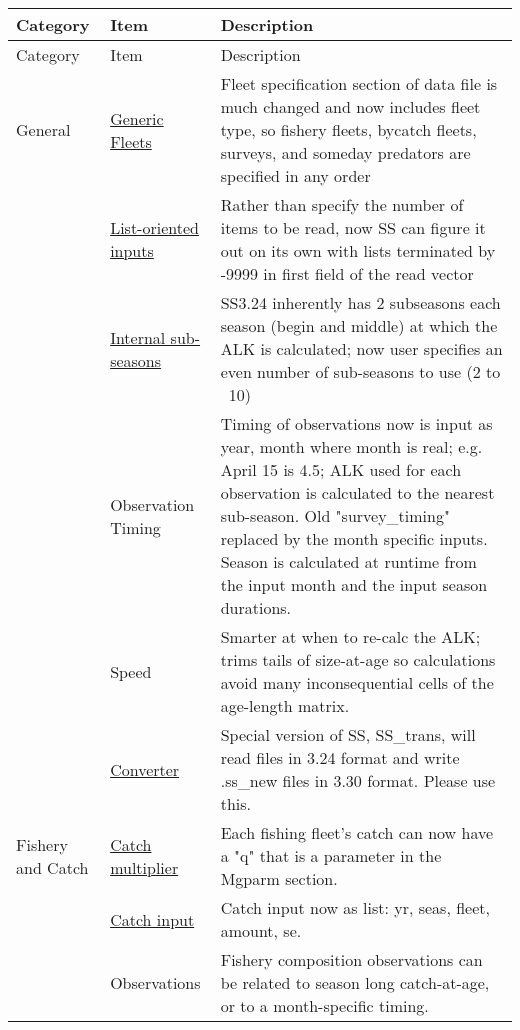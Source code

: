 		\begin{center}
			\begin{longtable}{p{2cm} p{3cm} p{10cm}}
				Category & Item & Description\\
				\hline
				\endfirsthead
		
				Category & Item & Description\\
				\hline
				\endhead
		
				\hline
				\endfoot
		
				\endlastfoot
				
				General & \hyperlink{GenericFleet}{Generic Fleets} & Fleet specification section of data file is much changed and now includes fleet type, so fishery fleets, bycatch fleets, surveys, and someday predators are specified in any order\\
				        & \hyperlink{ListBased}{List-oriented inputs} & Rather than specify the number of items to be read, now SS can figure it out on its own with lists terminated by -9999 in first field of the read vector \\
				        & \hyperlink{SubSeas}{Internal sub-seasons} & SS3.24 inherently has 2 subseasons each season (begin and middle) at which the ALK is calculated; now user specifies an even number of sub-seasons to use (2 to ~10) \\
				        & Observation Timing & Timing of observations now is input as year, month where month is real; e.g. April 15 is 4.5; ALK used for each observation is calculated to the nearest sub-season.  Old "survey\_timing" replaced by the month specific inputs.  Season is calculated at runtime from the input month and the input season durations. \\
				        & Speed & Smarter at when to re-calc the ALK; trims tails of size-at-age so calculations avoid many inconsequential cells of the age-length matrix. \\
				        & \hyperlink{Convert} {Converter} & Special version of SS, SS\_trans, will read files in 3.24 format and write .ss\_new files in 3.30 format.  Please use this.\\
				Fishery and Catch & \hyperlink{CatchMult}{Catch multiplier} & Each fishing fleet's catch can now have a "q" that is a parameter in the Mgparm section.\\
						& \hyperlink{CatchFormat}{Catch input} & Catch input now as list:  yr, seas, fleet, amount, se. \\
						& Observations & Fishery composition observations can be related to season long catch-at-age, or to a month-specific timing.\\

\end{longtable}
\end{center}

